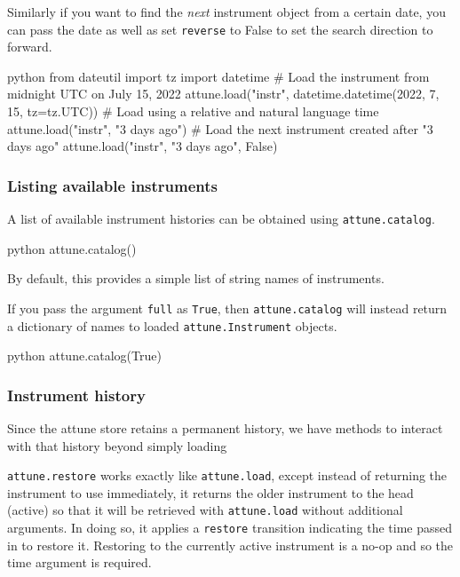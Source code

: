 Similarly if you want to find the \emph{next} instrument object from a
certain date, you can pass the date as well as set \texttt{reverse} to
False to set the search direction to forward.

\begin{codefragment}{python}
from dateutil import tz
import datetime
# Load the instrument from midnight UTC on July 15, 2022
attune.load("instr", datetime.datetime(2022, 7, 15, tz=tz.UTC))
# Load using a relative and natural language time
attune.load("instr", "3 days ago")
# Load the next instrument created after "3 days ago"
attune.load("instr", "3 days ago", False)
\end{codefragment}

\hypertarget{listing-available-instruments}{%
\subsubsection{Listing available
instruments}\label{listing-available-instruments}}

A list of available instrument histories can be obtained using
\texttt{attune.catalog}.

\begin{codefragment}{python}
attune.catalog()
\end{codefragment}

By default, this provides a simple list of string names of instruments.

If you pass the argument \texttt{full} as \texttt{True}, then
\texttt{attune.catalog} will instead return a dictionary of names to
loaded \texttt{attune.Instrument} objects.

\begin{codefragment}{python}
attune.catalog(True)
\end{codefragment}

\hypertarget{instrument-history}{%
\subsubsection{Instrument history}\label{instrument-history}}

Since the attune store retains a permanent history, we have methods to
interact with that history beyond simply loading

\hypertarget{restore}{%
\label{restore}}

\texttt{attune.restore} works exactly like \texttt{attune.load}, except
instead of returning the instrument to use immediately, it returns the
older instrument to the head (active) so that it will be retrieved with
\texttt{attune.load} without additional arguments. In doing so, it
applies a \texttt{restore} transition indicating the time passed in to
restore it. Restoring to the currently active instrument is a no-op and
so the time argument is required.

